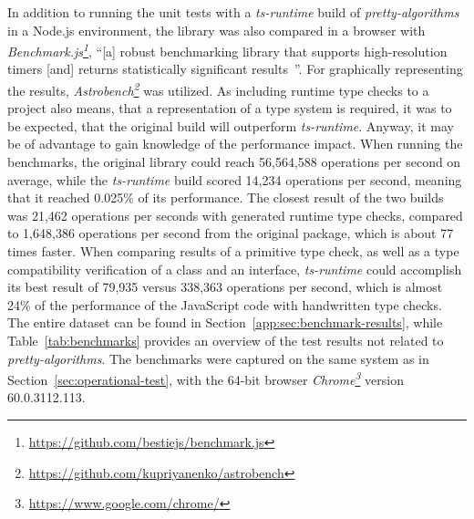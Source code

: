In addition to running the unit tests with a \emph{ts-runtime} build of \emph{pretty-algorithms} in a Node.js environment, the library was also compared in a browser with \emph{Benchmark.js\footnote{\url{https://github.com/bestiejs/benchmark.js}}}, ``[a] robust benchmarking library that supports high-resolution timers [and] returns statistically significant results~\cite{Evaluation:benchmarkjs}''. For graphically representing the results, \emph{Astrobench\footnote{\url{https://github.com/kupriyanenko/astrobench}}} was utilized. As including runtime type checks to a project also means, that a representation of a type system is required, it was to be expected, that the original build will outperform \emph{ts-runtime}. Anyway, it may be of advantage to gain knowledge of the performance impact. When running the benchmarks, the original library could reach 56,564,588 operations per second on average, while the \emph{ts-runtime} build scored 14,234 operations per second, meaning that it reached 0.025\% of its performance. The closest result of the two builds was 21,462 operations per seconds with generated runtime type checks, compared to 1,648,386 operations per second from the original package, which is about 77 times faster. When comparing results of a primitive type check, as well as a type compatibility verification of a class and an interface, \emph{ts-runtime} could accomplish its best result of 79,935 versus 338,363 operations per second, which is almost 24\% of the performance of the JavaScript code with handwritten type checks. The entire dataset can be found in Section~\ref{app:sec:benchmark-results}, while Table~\ref{tab:benchmarks} provides an overview of the test results not related to \emph{pretty-algorithms}. The benchmarks were captured on the same system as in Section~\ref{sec:operational-test}, with the 64-bit browser \emph{Chrome\footnote{\url{https://www.google.com/chrome/}}} version 60.0.3112.113.
